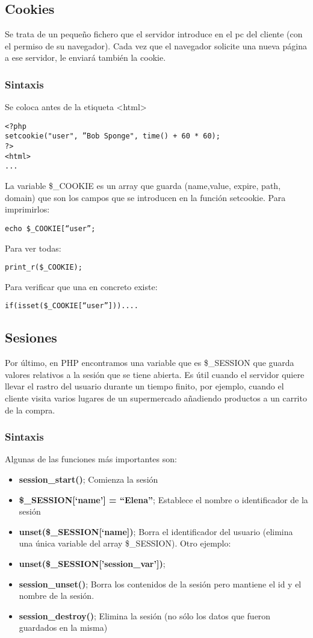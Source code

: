 \documentclass{apuntes}
\begin{document}
\subsection{Cookies}
Se trata de un pequeño fichero que el servidor introduce en el pc del cliente (con el permiso de su navegador). Cada vez que el navegador solicite una nueva página  a ese servidor, le enviará también la cookie.

\subsubsection{Sintaxis}
Se coloca antes de la etiqueta <html>
\begin{verbatim}
<?php
setcookie("user", ”Bob Sponge", time() + 60 * 60);
?>
<html>
...
\end{verbatim}

La variable \$\_COOKIE es un array que guarda (name,value, expire, path, domain) que son los campos que se introducen en la función setcookie.
Para imprimirlos:

\begin{verbatim}
echo $_COOKIE[“user”;
\end{verbatim}
Para ver todas:
\begin{verbatim}
print_r($_COOKIE);
\end{verbatim}
Para verificar que una en concreto existe:
\begin{verbatim}
if(isset($_COOKIE[“user”]))....
\end{verbatim}

\subsection{Sesiones}
Por último, en PHP encontramos una variable que es \$\_SESSION que guarda valores relativos a la sesión que se tiene abierta. Es útil cuando el servidor quiere llevar el rastro del usuario durante un tiempo finito, por ejemplo, cuando el cliente visita varios lugares de un supermercado añadiendo productos a un carrito de la compra.

\subsubsection{Sintaxis}
Algunas de las funciones más importantes son:
\begin{itemize}
\item \textbf{session\_start()}; Comienza la sesión
\item \textbf{\$\_SESSION[‘name’] = “Elena”}; Establece el nombre o identificador  de la sesión
\item \textbf{unset(\$\_SESSION[‘name])}; Borra el identificador del usuario (elimina una única variable del array \$\_SESSION). Otro ejemplo:
\item \textbf{unset(\$\_SESSION['session\_var'])};
\item \textbf{session\_unset()}; Borra los contenidos de la sesión pero mantiene el id y el nombre de la sesión.
\item \textbf{session\_destroy()}; Elimina la sesión (no sólo los datos que fueron guardados en la misma)

\end{itemize}

\printindex
\end{document}
